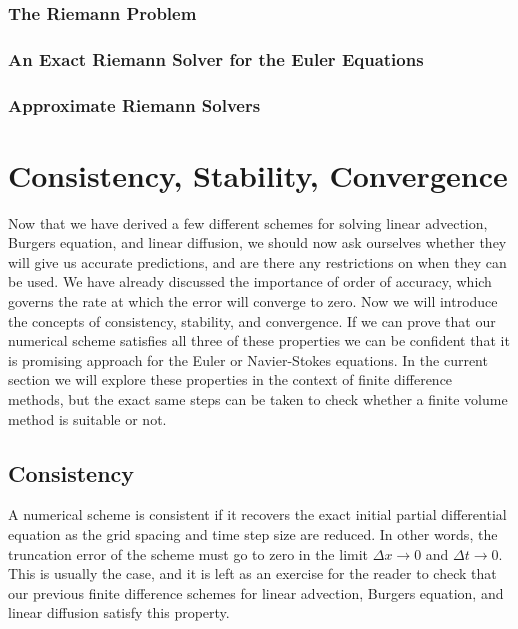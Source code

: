 \subsection{The Riemann Problem}
\subsection{An Exact Riemann Solver for the Euler Equations}
\subsection{Approximate Riemann Solvers}

\chapter{Consistency, Stability, Convergence}
Now that we have derived a few different schemes for solving linear advection, Burgers equation, and linear diffusion, we should now ask ourselves whether they will give us accurate predictions, and are there any restrictions on when they can be used. We have already discussed the importance of order of accuracy, which governs the rate at which the error will converge to zero. Now we will introduce the concepts of consistency, stability, and convergence. If we can prove that our numerical scheme satisfies all three of these properties we can be confident that it is promising approach for the Euler or Navier-Stokes equations. In the current section we will explore these properties in the context of finite difference methods, but the exact same steps can be taken to check whether a finite volume method is suitable or not.

\section{Consistency}
A numerical scheme is consistent if it recovers the exact initial partial differential equation as the grid spacing and time step size are reduced. In other words, the truncation error of the scheme must go to zero in the limit $\Delta x \rightarrow 0$ and $\Delta t \rightarrow 0$. This is usually the case, and it is left as an exercise for the reader to check that our previous finite difference schemes for linear advection, Burgers equation, and linear diffusion satisfy this property. 

